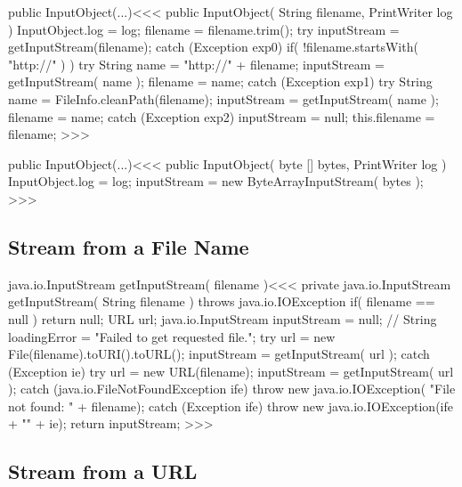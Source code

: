 \documentclass{article}
\begin{document}
\<public InputObject(...)\><<<
public InputObject( String filename, PrintWriter log ){
   InputObject.log = log;
   filename = filename.trim();
   try{
      inputStream = getInputStream(filename);
   } catch (Exception exp0){
      if( !filename.startsWith( "http://" ) ){
         try{
            String name = "http://" + filename;
            inputStream = getInputStream( name );
            filename = name;
         } catch (Exception exp1){
            try{
               String name = FileInfo.cleanPath(filename);
               inputStream = getInputStream( name );
               filename = name;
            } catch (Exception exp2){ inputStream = null; }
   }  }  }
   this.filename = filename;
}
>>>

\<public InputObject(...)\><<<
public InputObject( byte [] bytes, PrintWriter log ){
   InputObject.log = log;
   inputStream = new ByteArrayInputStream( bytes );
}
>>>



\subsection{Stream from a  File Name}



\<java.io.InputStream getInputStream( filename )\><<<
private java.io.InputStream getInputStream(
                                      String filename )
                                   throws java.io.IOException{
   if( filename == null ){ return null; }
   URL url;
   java.io.InputStream inputStream = null;
//   String loadingError = "Failed to get requested file.";
   try {
      url = new File(filename).toURI().toURL();
      inputStream =  getInputStream( url );
   } catch (Exception ie) {
       try {
           url = new URL(filename);
           inputStream =  getInputStream( url );
       } catch (java.io.FileNotFoundException ife) {
           throw new java.io.IOException(
              "File not found: " + filename);
       } catch (Exception ife) {
           throw new java.io.IOException(ife + "\n" + ie);
   }   }
   return inputStream;
}
>>>


\subsection{Stream from a URL}
\end{document}
